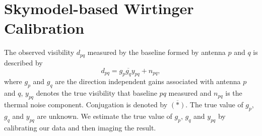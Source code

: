 \documentclass[useAMS,usenatbib]{mn2e}
\newcommand{\conj}[1]{\overline{#1}}
\begin{document}
% 
% 

\section{Skymodel-based Wirtinger Calibration}
\label{sec:sky_wirtinger}

The observed visibility $d_{pq}$ measured by the baseline formed by antenna $p$ and $q$ is described by
\begin{equation}
\label{eq:vis_definition}
d_{pq} = g_{p}\conj{g_q}y_{pq} + n_{pq},
\end{equation}
where $g_{p}$ and $g_{q}$ are the direction independent gains associated with antenna $p$ and $q$, $y_{pq}$ denotes the true visibility that baseline $pq$ measured
and $n_{pq}$ is the thermal noise component. Conjugation is denoted by $\conj{(*)}$. The true value of $g_p$, $g_q$ and $y_{pq}$ are unknown. We estimate the true value of
$g_p$, $g_q$ and $y_{pq}$ by calibrating our data and then imaging the result.
\end{document}
